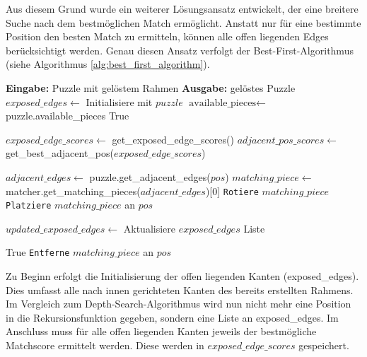 Aus diesem Grund wurde ein weiterer Lösungsansatz entwickelt, der eine breitere Suche nach dem bestmöglichen Match ermöglicht.
Anstatt nur für eine bestimmte Position den besten Match zu ermitteln, können alle offen liegenden Edges berücksichtigt werden. Genau diesen Ansatz verfolgt der Best-First-Algorithmus (siehe Algorithmus \ref{alg:best_first_algorithm}).

\begin{algorithm}[H]
\caption{Best-First-Algorithmus}\label{alg:best_first_algorithm}
\begin{algorithmic}[1]
\State \textbf{Eingabe:} Puzzle mit gelöstem Rahmen
\State \textbf{Ausgabe:} gelöstes Puzzle
\State $exposed\_edges \gets$ Initialisiere mit $puzzle$ 
\State {}
\State {}
    \State $\text{available\_pieces} \gets$ puzzle.available\_pieces
     
        \State \Return True
    \EndIf

    \State $exposed\_edge\_scores \gets$ get\_exposed\_edge\_scores()
    \State $adjacent\_pos\_scores \gets$  get\_best\_adjacent\_pos($exposed\_edge\_scores$)

        \State $adjacent\_edges \gets$ puzzle.get\_adjacent\_edges($pos$)
        \State $matching\_piece \gets$ matcher.get\_matching\_pieces($adjacent\_edges$)[0]
        \State \texttt{Rotiere} $matching\_piece$
        \State \texttt{Platziere} $matching\_piece$ an $pos$

        \State $updated\_exposed\_edges \gets$ Aktualisiere $exposed\_edges$ Liste

            \State \Return True
        \Else
            \State \texttt{Entferne} $matching\_piece$ an $pos$
        \EndIf      
    \EndFor
    
\EndFunction
\end{algorithmic}
\end{algorithm}

Zu Beginn erfolgt die Initialisierung der offen liegenden Kanten (exposed\_edges). Dies umfasst alle nach innen gerichteten Kanten des bereits erstellten Rahmens. Im Vergleich zum Depth-Search-Algorithmus wird nun nicht mehr eine Position in die Rekursionsfunktion gegeben, sondern eine Liste an exposed\_edges. Im Anschluss muss für alle offen liegenden Kanten jeweils der bestmögliche Matchscore ermittelt werden. Diese werden in $exposed\_edge\_scores$ gespeichert.

